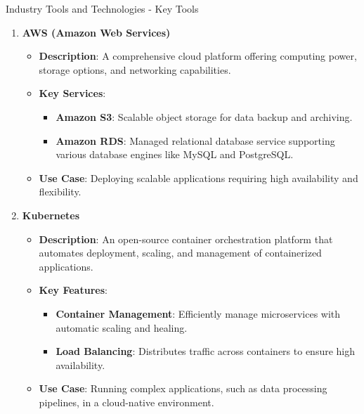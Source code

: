 \documentclass[aspectratio=169]{beamer}
\begin{document}
\begin{frame}[fragile]{Industry Tools and Technologies - Key Tools}
  \begin{enumerate}
    \item \textbf{AWS (Amazon Web Services)}
      \begin{itemize}
        \item \textbf{Description}: A comprehensive cloud platform offering computing power, storage options, and networking capabilities.
        \item \textbf{Key Services}:
          \begin{itemize}
            \item \textbf{Amazon S3}: Scalable object storage for data backup and archiving.
            \item \textbf{Amazon RDS}: Managed relational database service supporting various database engines like MySQL and PostgreSQL.
          \end{itemize}
        \item \textbf{Use Case}: Deploying scalable applications requiring high availability and flexibility.
      \end{itemize}
      
    \item \textbf{Kubernetes}
      \begin{itemize}
        \item \textbf{Description}: An open-source container orchestration platform that automates deployment, scaling, and management of containerized applications.
        \item \textbf{Key Features}:
          \begin{itemize}
            \item \textbf{Container Management}: Efficiently manage microservices with automatic scaling and healing.
            \item \textbf{Load Balancing}: Distributes traffic across containers to ensure high availability.
          \end{itemize}
        \item \textbf{Use Case}: Running complex applications, such as data processing pipelines, in a cloud-native environment.
      \end{itemize}
      

\end{enumerate}
\end{frame}
\end{document}
